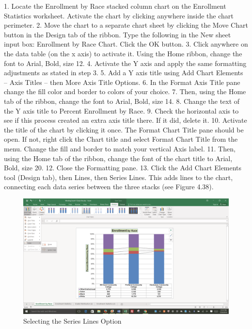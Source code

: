 1. Locate the Enrollment by Race stacked column chart on the Enrollment Statistics worksheet.
Activate the chart by clicking anywhere inside the chart perimeter.
2. Move the chart to a separate chart sheet by clicking the Move Chart button in the Design tab of
the ribbon. Type the following in the New sheet input box: Enrollment by Race Chart. Click
the OK button.
3. Click anywhere on the data table (on the x axis) to activate it. Using the Home ribbon, change
the font to Arial, Bold, size 12.
4. Activate the Y axis and apply the same formatting adjustments as stated in step 3.
5. Add a Y axis title using Add Chart Elements – Axis Titles – then More Axis Title Options.
6. In the Format Axis Title pane change the fill color and border to colors of your choice.
7. Then, using the Home tab of the ribbon, change the font to Arial, Bold, size 14.
8. Change the text of the Y axis title to Percent Enrollment by Race.
9. Check the horizontal axis to see if this process created an extra axis title there. If it did, delete it.
10. Activate the title of the chart by clicking it once. The Format Chart Title pane should be open.
If not, right click the Chart title and select Format Chart Title from the menu. Change
the fill and border to match your vertical Axis label.
11. Then, using the Home tab of the ribbon, change the font of the chart title to Arial, Bold, size 20.
12. Close the Formatting pane.
13. Click the Add Chart Elements tool (Design tab), then Lines, then Series Lines.
This adds lines to the chart, connecting each data series between the three stacks (see Figure
4.38).



\begin{figure}[H]
	\centering
	\includegraphics[width=\maxwidth{.95\linewidth}]{gfx/ch04_fig41}
	\caption{Selecting the Series Lines Option}
	\label{04:fig41}
\end{figure}

